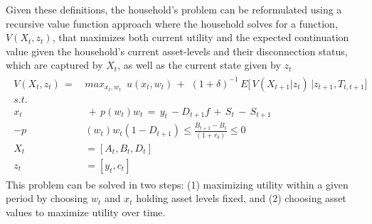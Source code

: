 \documentclass[12pt]{article}
\begin{document}



Given these definitions, the household's problem can be reformulated using a recursive value function approach where the household solves for a function, $V(X_t,z_t)$, that maximizes both current utility and the expected continuation value given the household's current asset-levels and their disconnection status, which are captured by $X_t$, as well as the current state given by $z_t$
\begin{align}\label{eq:valmax}
\begin{split}
V(X_t,z_t) \,=\, &max_{x_t,w_t}  \,\,\, u(x_t,w_t) \,+\,\, (1+\delta)^{-1} \, E \Big[\, V(X_{t+1}|z_{t})\,\Big| z_{t+1}, T_{t,t+1} \Big]
\\
s.t.& \\
x_t & \, + \, p(w_t) w_t \, = \, y_t \, - D_{t+1} f  \, + \, S_t \, - \, S_{t+1} \\
-p&(w_t) w_t (1-D_{t+1}) \leq \frac{B_{t+1}-B_t}{(1+r_b)} \leq 0  \\
X_t &= [A_{t},B_{t},D_{t}] \\
z_t &= [y_t,c_t]
\end{split} 
\end{align}
This problem can be solved in two steps: (1) maximizing utility within a given period by choosing $w_t$ and $x_t$ holding asset levels fixed, and (2) choosing asset values to maximize utility over time.
\end{document}
